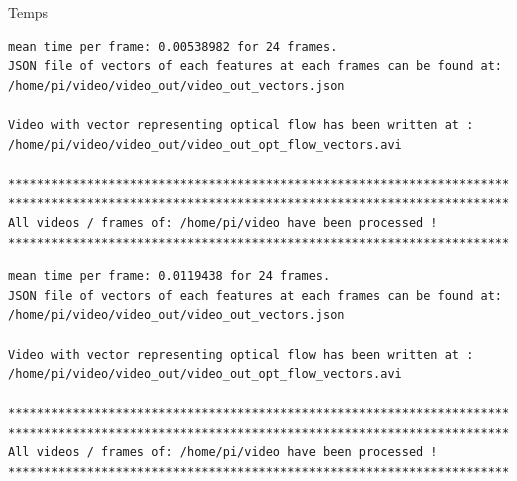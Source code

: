 \documentclass{bredelebeamer}
\begin{document}
\begin{frame}[fragile]{Temps}

\begin{lstlisting}
mean time per frame: 0.00538982 for 24 frames.
JSON file of vectors of each features at each frames can be found at: /home/pi/video/video_out/video_out_vectors.json

Video with vector representing optical flow has been written at : /home/pi/video/video_out/video_out_opt_flow_vectors.avi

**********************************************************************
**********************************************************************
All videos / frames of: /home/pi/video have been processed !
**********************************************************************
\end{lstlisting}

\begin{lstlisting}
mean time per frame: 0.0119438 for 24 frames.
JSON file of vectors of each features at each frames can be found at: /home/pi/video/video_out/video_out_vectors.json

Video with vector representing optical flow has been written at : /home/pi/video/video_out/video_out_opt_flow_vectors.avi

**********************************************************************
**********************************************************************
All videos / frames of: /home/pi/video have been processed !
**********************************************************************
\end{lstlisting}

\end{frame}

\end{document}
